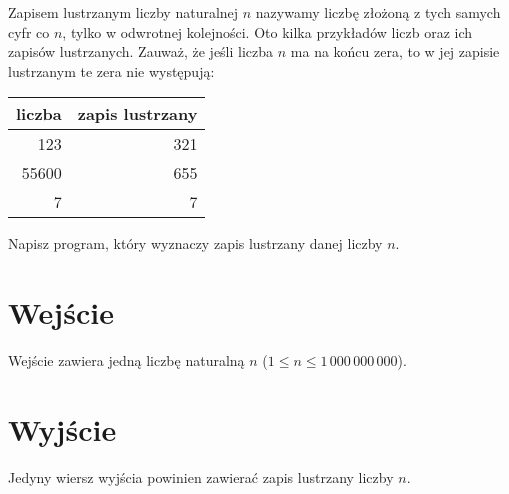 \documentclass{spiral-kurs}
\begin{document}
\makeheader
%
    Zapisem lustrzanym liczby naturalnej $n$ nazywamy liczbę złożoną
    z tych samych cyfr co $n$, tylko w odwrotnej kolejności.
    Oto kilka przykładów liczb oraz ich zapisów lustrzanych.
    Zauważ, że jeśli liczba $n$ ma na końcu zera, to w jej zapisie
    lustrzanym te zera nie występują:

    \begin{center}
      \begin{tabular}{|r|r|}
        \hline
        liczba & zapis lustrzany\\\hline
           123 & 321\\\hline
         55600 & 655\\\hline
             7 & 7 \\\hline
      \end{tabular}
    \end{center}

    \noindent
    Napisz program, który wyznaczy zapis lustrzany danej liczby $n$.

    \section{Wejście}
    Wejście zawiera jedną liczbę naturalną $n$
    ($1 \le n \le 1\,000\,000\,000$).
      
    \section{Wyjście}
    Jedyny wiersz wyjścia powinien zawierać zapis lustrzany liczby $n$.



  
\end{document}
